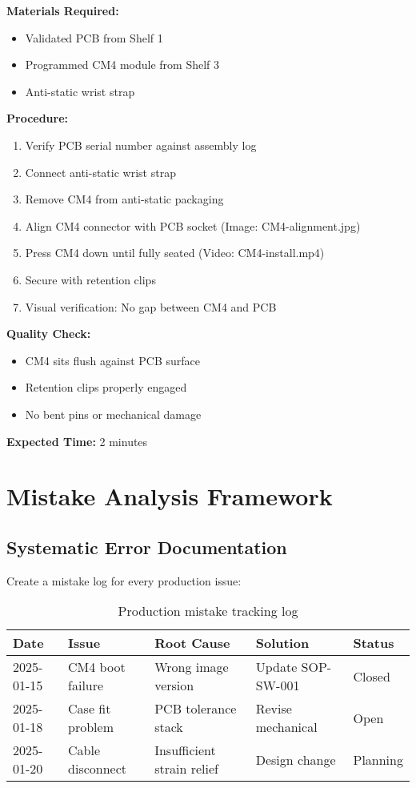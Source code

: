 \begin{tcolorbox}[colback=gray!5,colframe=gray!50,title=SOP-PCB-001: CM4 Installation]
\textbf{Materials Required:}
\begin{itemize}
\item Validated PCB from Shelf 1
\item Programmed CM4 module from Shelf 3
\item Anti-static wrist strap
\end{itemize}

\textbf{Procedure:}
\begin{enumerate}
\item Verify PCB serial number against assembly log
\item Connect anti-static wrist strap
\item Remove CM4 from anti-static packaging
\item Align CM4 connector with PCB socket (Image: CM4-alignment.jpg)
\item Press CM4 down until fully seated (Video: CM4-install.mp4)
\item Secure with retention clips
\item Visual verification: No gap between CM4 and PCB
\end{enumerate}

\textbf{Quality Check:}
\begin{itemize}
\item CM4 sits flush against PCB surface
\item Retention clips properly engaged
\item No bent pins or mechanical damage
\end{itemize}

\textbf{Expected Time:} 2 minutes
\end{tcolorbox}

\section{Mistake Analysis Framework}

\subsection{Systematic Error Documentation}

Create a mistake log for every production issue:

\begin{table}[h]
\centering
\begin{tabular}{|l|p{2cm}|p{2cm}|p{2cm}|p{1.5cm}|}
\hline
\textbf{Date} & \textbf{Issue} & \textbf{Root Cause} & \textbf{Solution} & \textbf{Status} \\
\hline
2025-01-15 & CM4 boot failure & Wrong image version & Update SOP-SW-001 & Closed \\
2025-01-18 & Case fit problem & PCB tolerance stack & Revise mechanical & Open \\
2025-01-20 & Cable disconnect & Insufficient strain relief & Design change & Planning \\
\hline
\end{tabular}
\caption{Production mistake tracking log}
\end{table}


